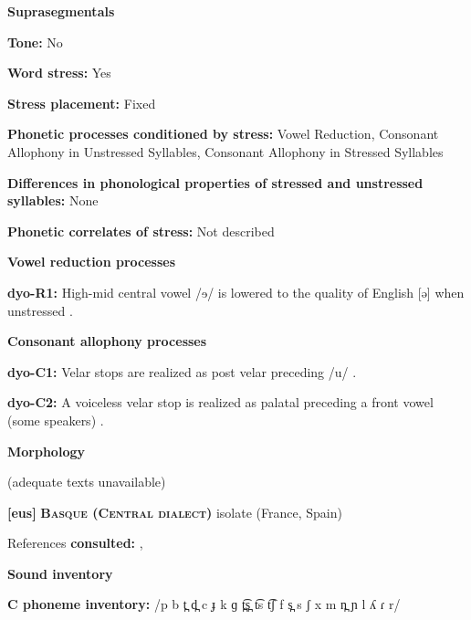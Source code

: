 \textbf{Suprasegmentals}



\textbf{Tone:} No



\textbf{Word stress:} Yes



\textbf{Stress placement:} Fixed



\textbf{Phonetic processes conditioned by stress:} Vowel Reduction, Consonant Allophony in Unstressed Syllables, Consonant Allophony in Stressed Syllables



\textbf{Differences in phonological properties of stressed and unstressed syllables:} None



\textbf{Phonetic correlates of stress:} Not described



\textbf{Vowel reduction processes}



\textbf{dyo-R1:} High-mid central vowel /ɘ/ is lowered to the quality of English [ə] when unstressed \citep[6]{Sapir1965}.



\textbf{Consonant allophony processes}



\textbf{dyo-C1:} Velar stops are realized as post velar preceding /u/ \citep[5]{Sapir1965}.



\textbf{dyo-C2:} A voiceless velar stop is realized as palatal preceding a front vowel (some speakers) \citep{Sapir1965}.



\textbf{Morphology}



(adequate texts unavailable)



\textbf{[eus]}   \textbf{\textsc{Basque (Central dialect)}}  isolate (France, Spain)



References \textbf{consulted:} \citet{Hualde2003}, \citet{SaltarelliEtAl1988}



\textbf{Sound inventory}



\textbf{C phoneme inventory:} /p b t̪ d̪ c ɟ k ɡ t̪͡s̪ t͡s t͡ʃ f s̪ s ʃ x m n̪ ɲ l ʎ ɾ r/



